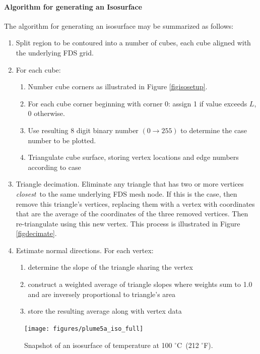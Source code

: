 \documentclass[11pt,twoside]{book}
\newcommand{\degF}{$^\circ$F}
\newcommand{\degC}{$^\circ$C}
\newcommand{\figoptions}{htp}
\begin{document}
\paragraph{Algorithm for generating an Isosurface} The algorithm for generating an isosurface may be summarized as follows:
\begin{enumerate}
\item Split region to be contoured into a number of cubes, each cube aligned with the underlying FDS grid.
\item For  each cube:
\begin{enumerate}
\item Number cube corners as illustrated in Figure \ref{figisosetup}.
\item For each cube corner beginning with corner 0: assign 1 if value exceeds $L$, 0 otherwise.
\item Use resulting 8 digit binary number $(0\rightarrow 255)$ to determine the case number to be plotted.
\item Triangulate cube surface, storing vertex locations and edge numbers according to case
\end{enumerate}
\item Triangle decimation.  Eliminate any triangle that has two or more vertices {\em closest}\ to the same underlying FDS mesh node.
If this is the case, then remove this triangle's vertices, replacing them with a vertex with coordinates that are the average of the coordinates of the three removed vertices.  Then re-triangulate using this new vertex.  This process is illustrated in Figure \ref{figdecimate}.
\item Estimate normal directions.  For each vertex:
\begin{enumerate}
\item determine the slope of the triangle sharing the vertex
\item construct a weighted average of triangle slopes where weights sum to 1.0 and are inversely proportional to triangle's area
\item store the resulting average along with vertex data
\end{enumerate}
\end{enumerate}

\begin{figure}[\figoptions]
\begin{center}
\texttt{[image: figures/plume5a\_iso\_full]}\\
\end{center}
\caption{Snapshot of an isosurface of temperature at 100 \degC\ (212 \degF).
  }
\label{figisoa}%
\end{figure}
\end{document}
